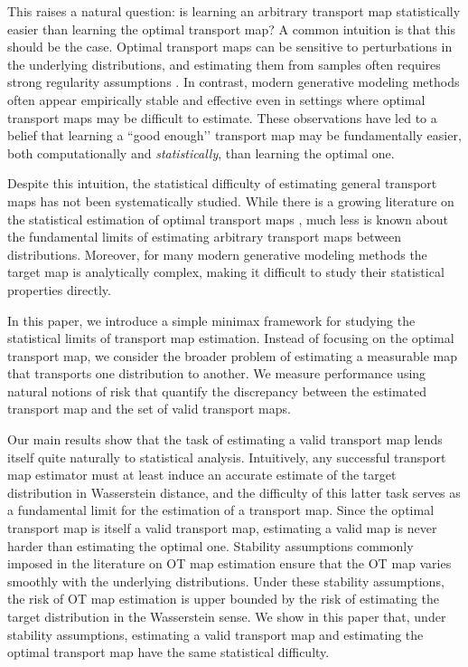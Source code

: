 \documentclass[11pt,twoside]{article}
\begin{document}
This raises a natural question: is learning an arbitrary transport map statistically easier than learning the optimal transport map? A common intuition is that this should be the case. Optimal transport maps can be sensitive to perturbations in the underlying distributions, and estimating them from samples often requires strong regularity assumptions \cite{caffarelli1992regularity,figalli2017monge}. In contrast, modern generative modeling methods often appear empirically stable and effective even in settings where optimal transport maps may be difficult to estimate. These observations have led to a belief that learning a “good enough’’ transport map may be fundamentally easier, both computationally and \emph{statistically}, than learning the optimal one.

Despite this intuition, the statistical difficulty of estimating general transport maps has not been systematically studied. While there is a growing literature on the statistical estimation of optimal transport maps \cite{manole2024plugin,deb2021,hutter2021}, much less is known about the fundamental limits of estimating arbitrary transport maps between distributions. Moreover, for many modern generative modeling methods the target map is analytically complex, making it difficult to study their statistical properties directly.

In this paper, we introduce a simple minimax framework for studying the statistical limits of transport map estimation. Instead of focusing on the optimal transport map, we consider the broader problem of estimating a measurable map that transports one distribution to another. We measure performance using natural notions of risk that quantify the discrepancy between the estimated transport map and the set of valid transport maps.

Our main results show that the task of estimating a valid transport map lends itself quite naturally to statistical analysis. Intuitively, any successful transport map estimator must at least induce an accurate estimate of the target distribution in Wasserstein distance, and the difficulty of this latter task serves as a fundamental limit for the estimation of a transport map. Since the optimal transport map is itself a valid transport map, estimating a valid map is never harder than estimating the optimal one. Stability assumptions commonly imposed in the literature on OT map estimation ensure that the OT map varies smoothly with the underlying distributions. Under these stability assumptions, the risk of OT map estimation is upper bounded by the risk of estimating the target distribution in the Wasserstein sense. We show in this paper that, under stability assumptions, estimating a valid transport map and estimating the optimal transport map have the same statistical difficulty. 
\end{document}
